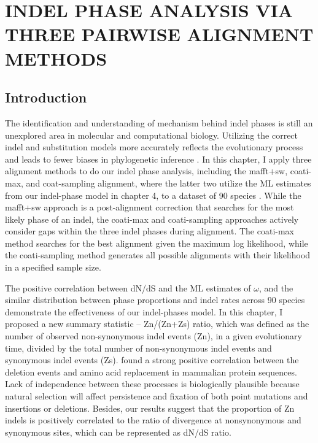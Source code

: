 \chapter{\normalfont  INDEL PHASE ANALYSIS VIA THREE PAIRWISE ALIGNMENT METHODS}
\label{ch:three_aln_methods}

\section{Introduction}
The identification and understanding of mechanism behind indel phases is still an unexplored area in molecular and computational biology. Utilizing the correct indel and substitution models more accurately reflects the evolutionary process and leads to fewer biases in phylogenetic inference \parencite{arenas2015trends}. In this chapter, I apply three alignment methods to do our indel phase analysis, including the mafft+sw, coati-max, and coat-sampling alignment, where the latter two utilize the ML estimates from our indel-phase model in chapter 4, to a dataset of 90 species \parencite{zou2021nonsynonymous}. While the mafft+sw approach is a post-alignment correction that searches for the most likely phase of an indel, the coati-max and coati-sampling approaches actively consider gaps within the three indel phases during alignment. The coati-max method searches for the best alignment given the maximum log likelihood, while the coati-sampling method generates all possible alignments with their likelihood in a specified sample size.

The positive correlation between dN/dS and the ML estimates of $\omega$, and the similar distribution between phase proportions and indel rates across 90 species demonstrate the effectiveness of our indel-phases model. In this chapter, I proposed a new summary statistic – Zn/(Zn+Zs) ratio, which was defined as the number of observed non-synonymous indel events (Zn), in a given evolutionary time, divided by the total number of non-synonymous indel events and synonymous indel events (Zs). \cite{zheng2018correlated} found a strong positive correlation between the deletion events and amino acid replacement in mammalian protein sequences.  Lack of independence between these processes is biologically plausible because natural selection will affect persistence and fixation of both point mutations and insertions or deletions. Besides, our results suggest that the proportion of Zn indels is positively correlated to the ratio of divergence at nonsynonymous and synonymous sites, which can be represented as dN/dS ratio. 


